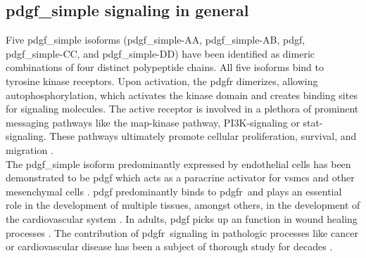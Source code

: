     \subsection{\ac{pdgf_simple} signaling in general}
    \label{subsec:pdgf_the_cytokine}
    Five \ac{pdgf_simple} isoforms (\ac{pdgf_simple}-AA, \ac{pdgf_simple}-AB, \ac{pdgf}, \ac{pdgf_simple}-CC, and \ac{pdgf_simple}-DD) have been identified as dimeric combinations of four distinct polypeptide chains. All five isoforms bind to tyrosine kinase receptors. Upon activation, the \ac{pdgfr} dimerizes, allowing autophosphorylation, which activates the kinase domain and creates binding sites for signaling molecules. The active receptor is involved in a plethora of prominent messaging pathways like the \ac{map}-kinase pathway, \ac{PI3K}-signaling or \ac{stat}-signaling. These pathways ultimately promote cellular proliferation, survival, and migration \cite{chenPlateletderivedGrowthFactors2013, heldinTargetingPDGFSignaling2013, huTargetingPlateletderivedGrowth2015}.\\
    The \ac{pdgf_simple} isoform predominantly expressed by endothelial cells has been demonstrated to be \ac{pdgf} \cite{andraeRolePlateletderivedGrowth2008, heldinTargetingPDGFSignaling2013} which acts as a paracrine activator for \acp{vsmc} and other mesenchymal cells \cite{heldinTargetingPDGFSignaling2013}. \ac{pdgf} predominantly binds to \ac{pdgfr}\beta~and plays an essential role in the development of multiple tissues, amongst others, in the development of the cardiovascular system \cite{leveenMiceDeficientPDGF1994}. In adults, \ac{pdgf} picks up an function in wound healing processes \cite{robsonPlateletderivedGrowthFactor1992}. The contribution of \ac{pdgfr}\beta~signaling in pathologic processes like cancer or cardiovascular disease has been a subject of thorough study for decades \cite{heldinTargetingPDGFSignaling2013, rainesPDGFCardiovascularDisease2004}.

